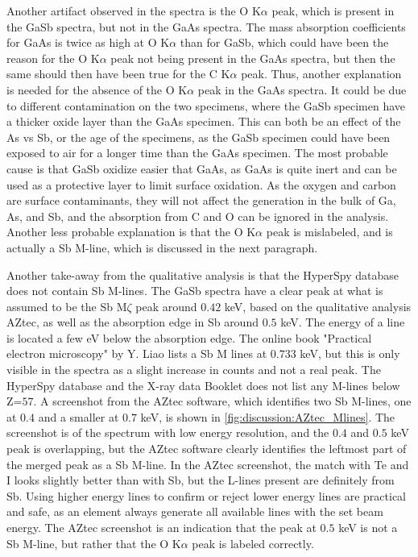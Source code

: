 Another artifact observed in the spectra is the O K$\alpha$ peak, which is present in the GaSb spectra, but not in the GaAs spectra.
The mass absorption coefficients for GaAs is twice as high at O K$\alpha$ than for GaSb, which could have been the reason for the O K$\alpha$ peak not being present in the GaAs spectra, but then the same should then have been true for the C K$\alpha$ peak.
Thus, another explanation is needed for the absence of the O K$\alpha$ peak in the GaAs spectra.
It could be due to different contamination on the two specimens, where the GaSb specimen have a thicker oxide layer than the GaAs specimen.
This can both be an effect of the As vs Sb, or the age of the specimens, as the GaSb specimen could have been exposed to air for a longer time than the GaAs specimen.
The most probable cause is that GaSb oxidize easier that GaAs, as GaAs is quite inert and can be used as a protective layer to limit surface oxidation.
As the oxygen and carbon are surface contaminants, they will not affect the generation in the bulk of Ga, As, and Sb, and the absorption from C and O can be ignored in the analysis.
Another less probable explanation is that the O K$\alpha$ peak is mislabeled, and is actually a Sb M-line, which is discussed in the next paragraph.



Another take-away from the qualitative analysis is that the HyperSpy database does not contain Sb M-lines.
The GaSb spectra have a clear peak at what is assumed to be the Sb M$\zeta$ peak around $0.42$ keV, based on the qualitative analysis AZtec, as well as the absorption edge in Sb around $0.5$ keV.
The energy of a line is located a few eV below the absorption edge.
The online book "Practical electron microscopy" by Y. Liao \cite{liao2006practical} lists a Sb M lines at $0.733$ keV, but this is only visible in the spectra as a slight increase in counts and not a real peak.
The HyperSpy database and the X-ray data Booklet \cite{thompson_x-ray_2004} does not list any M-lines below Z=$57$.
A screenshot from the AZtec software, which identifies two Sb M-lines, one at $0.4$ and a smaller at $0.7$ keV, is shown in \cref{fig:discussion:AZtec_Mlines}.
The screenshot is of the spectrum with low energy resolution, and the $0.4$ and $0.5$ keV peak is overlapping, but the AZtec software clearly identifies the leftmost part of the merged peak as a Sb M-line.
In the AZtec screenshot, the match with Te and I looks slightly better than with Sb, but the L-lines present are definitely from Sb.
Using higher energy lines to confirm or reject lower energy lines are practical and safe, as an element always generate all available lines with the set beam energy.
The AZtec screenshot is an indication that the peak at $0.5$ keV is not a Sb M-line, but rather that the O K$\alpha$ peak is labeled correctly.


